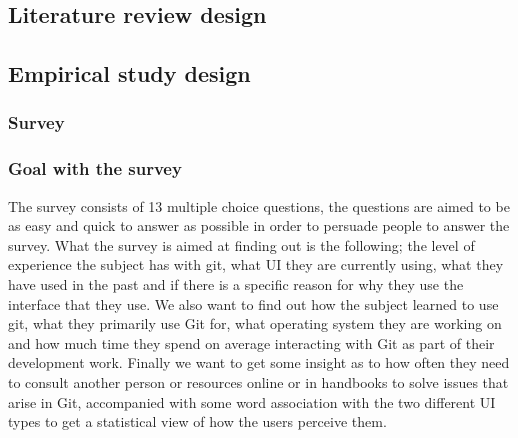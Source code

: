 \documentclass[12pt,a4paper,article,compsoc]{IEEEtran}
\begin{document}
			\subsection{Literature review design}
			
			\subsection{Empirical study design}
			
				\subsubsection{Survey}
				\subsubsection*{Goal with the survey}
				The survey consists of 13 multiple choice questions, the questions are aimed to be as easy and quick to answer as possible in order to persuade people to answer the survey. What the survey is aimed at finding out is the following; the level of experience the subject has with git, what UI they are currently using, what they have used in the past and if there is a specific reason for why they use the interface that they use. We also want to find out how the subject learned to use git, what they primarily use Git for, what operating system they are working on and how much time they spend on average interacting with Git as part of their development work. Finally we want to get some insight as to how often they need to consult another person or resources online or in handbooks to solve issues that arise in Git, accompanied with some word association with the two different UI types to get a statistical view of how the users perceive them.
					
\end{document}
